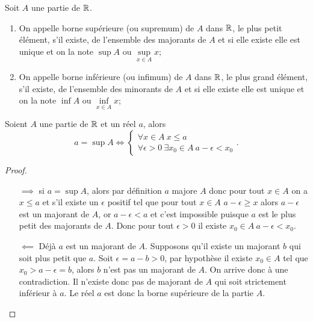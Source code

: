 Soit \(A\) une partie de \(\mathbb{R}\).
\begin{defdef}
  \begin{enumerate}
    \item On appelle borne supérieure (ou supremum) de \(A\) dans \(\mathbb{R}\), le 
      plus petit élément, s'il existe, de l'ensemble des majorants de \(A\) et 
      si elle existe elle est unique et on la note \(\sup A\) ou 
      \(\sup\limits_{x\in A} x\);
    \item On appelle borne inférieure (ou infimum) de \(A\) dans \(\mathbb{R}\), le plus 
      grand élément, s'il existe, de l'ensemble des minorants de \(A\) et si 
      elle existe elle est unique et on la note \(\inf A\) ou 
      \(\inf\limits_{x\in A} x\);
  \end{enumerate}
\end{defdef}
\begin{theo}
  Soient \(A\) une partie de \(\mathbb{R}\) et un réel \(a\), alors
  \begin{equation}
    a=\sup A \iff \begin{cases} \forall x \in A \ x\leqslant a \\  \forall 
    \epsilon >0 \ \exists x_0\in A \ a-\epsilon<x_0\end{cases}.
  \end{equation}
\end{theo}
\begin{proof}
  \begin{itemize}
    \item[\(\implies\)] si \(a=\sup A\), alors par définition \(a\) majore \(A\) 
      donc pour tout \(x \in A\) on a \(x\leqslant a\) et s'il existe un 
      \(\epsilon\) positif tel que pour tout \(x\in A\) \(a-\epsilon\geqslant 
      x\) alors \(a-\epsilon\) est un majorant de \(A\), or \(a-\epsilon<a\) et 
      c'est impossible puisque \(a\) est le plus petit des majorants de \(A\). 
      Donc pour tout \(\epsilon >0\) il existe \(x_0\in A \ a-\epsilon<x_0\).
    \item [\(\impliedby\)] Déjà \(a\) est un majorant de \(A\). Supposons qu'il 
      existe un majorant \(b\) qui soit plus petit que \(a\). Soit 
      \(\epsilon=a-b>0\), par hypothèse il existe \(x_0\in A\) tel que 
      \(x_0>a-\epsilon=b\), alors \(b\) n'est pas un majorant de \(A\). On 
      arrive donc à une contradiction. Il n'existe donc pas de majorant de \(A\) 
      qui soit strictement inférieur à \(a\). Le réel \(a\) est donc la borne 
      supérieure de la partie \(A\).
  \end{itemize}
\end{proof}

